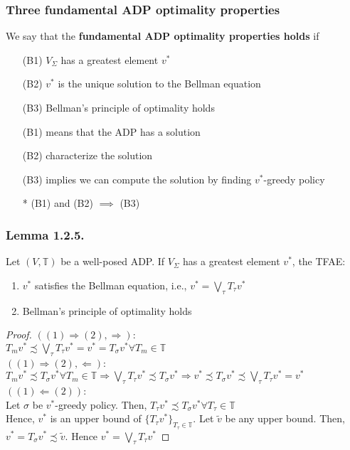 \documentclass[11pt,xcolor={dvipsnames},hyperref={pdftex,pdfpagemode=UseNone,hidelinks,pdfdisplaydoctitle=true},usepdftitle=false]{beamer}
\begin{document}
\begin{frame}
\frametitle{Three fundamental ADP optimality properties}
We say that the \textbf{fundamental ADP optimality properties holds} if
\begin{enumerate}
\item[(B1)] $V_\Sigma$ has a greatest element $v^*$
\item[(B2)] $v^*$ is the unique solution to the Bellman equation
\item[(B3)] Bellman's principle of optimality holds
\end{enumerate}
\begin{remark}
\begin{enumerate}
\item[(B1)] means that the ADP has a solution
\item[(B2)] characterize the solution
\item[(B3)] implies we can compute the solution by finding $v^*$-greedy policy
\item[*] (B1) and (B2) $\implies$ (B3)
\end{enumerate}
\end{remark}
\end{frame}

\begin{frame}
\frametitle{Lemma 1.2.5.}
Let $(V,\mathbb{T})$ be a well-posed ADP. If $V_\Sigma$ has a greatest element $v^*$, the TFAE:
\begin{enumerate}
\item $v^*$ satisfies the Bellman equation, i.e., $v^* = \bigvee_\tau T_\tau v^*$
\item Bellman's principle of optimality holds
\end{enumerate}
\begin{proof}
$((1)\Rightarrow(2), \Rightarrow)$:\\
$T_{m} v^* \precsim \bigvee_\tau T_\tau v^* =v^*= T_\sigma v^*\forall T_m\in \mathbb{T}$\\
$((1)\Rightarrow(2), \Leftarrow)$:\\
$T_m v^* \precsim T_\sigma v^*\forall T_m\in\mathbb{T} \Rightarrow\bigvee_\tau T_\tau v^*\precsim T_\sigma v^* \Rightarrow v^*\precsim T_\sigma v^*\precsim \bigvee_\tau T_\tau v^*=v^*$
$((1)\Leftarrow(2))$:\\
Let $\sigma$ be $v^*$-greedy policy. Then, $T_\tau v^*\precsim T_\sigma v^*\forall T_\tau \in\mathbb{T}$\\
Hence, $v^*$ is an upper bound of $\{T_\tau v^*\}_{T_\tau \in\mathbb{T}}$. Let $\tilde v$ be any upper bound. Then, $v^*= T_\sigma v^* \precsim \tilde v$. Hence $v^* = \bigvee_\tau  T_\tau v^*$
\end{proof}
\end{frame}
\end{document}
